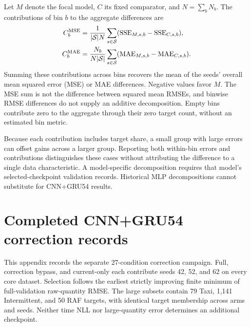 \documentclass[runningheads]{llncs}
\begin{document}
Let $M$ denote the focal model, $C$ its fixed comparator, and
$N=\sum_bN_b$. The contributions of bin $b$ to the aggregate differences are
\begin{align}
 C_b^{\rm MSE}&=\frac{1}{|\mathcal S|N}\sum_{s\in\mathcal S}
  (\mathrm{SSE}_{M,s,b}-\mathrm{SSE}_{C,s,b}),
  \label{eq:strata-mse-contribution}\\
 C_b^{\rm MAE}&=\frac{N_b}{N|\mathcal S|}\sum_{s\in\mathcal S}
  (\mathrm{MAE}_{M,s,b}-\mathrm{MAE}_{C,s,b}).
  \label{eq:strata-mae-contribution}
\end{align}
Summing these contributions across bins recovers the mean of the seeds'
overall mean squared error (MSE) or MAE differences. Negative values favor $M$. The MSE sum is
not the difference between squared mean RMSEs, and binwise RMSE differences
do not supply an additive decomposition. Empty bins contribute zero to the
aggregate through their zero target count, without an estimated bin metric.

Because each contribution includes target share, a small group with large
errors can offset gains across a larger group. Reporting both within-bin
errors and contributions distinguishes these cases without attributing the
difference to a single data characteristic. A model-specific decomposition
requires that model's selected-checkpoint validation records. Historical
MLP decompositions cannot substitute for CNN+GRU54 results.

\clearpage
\section{Completed CNN+GRU54 correction records}
\label{app:history-completed}
This appendix records the separate 27-condition correction campaign. Full, correction bypass, and current-only each contribute seeds 42, 52, and 62 on every core dataset. Selection follows the earliest strictly improving finite minimum of full-validation raw-quantity RMSE. The large subsets contain 79 Taxi, 1,141 Intermittent, and 50 RAF targets, with identical target membership across arms and seeds. Neither time NLL nor large-quantity error determines an additional checkpoint.
\end{document}
